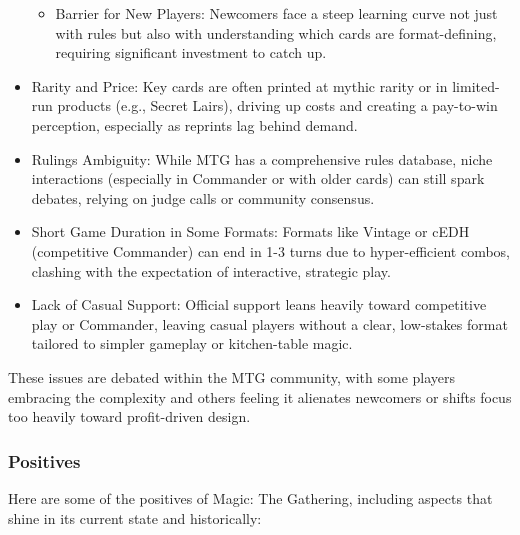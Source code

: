 \begin{itemize}
\begin{itemize}
		\item Barrier for New Players: Newcomers face a steep learning curve not just with rules but also with understanding which cards are format-defining, requiring significant investment to catch up.
	\end{itemize}
\item Rarity and Price: Key cards are often printed at mythic rarity or in limited-run products (e.g., Secret Lairs), driving up costs and creating a pay-to-win perception, especially as reprints lag behind demand.
\item Rulings Ambiguity: While MTG has a comprehensive rules database, niche interactions (especially in Commander or with older cards) can still spark debates, relying on judge calls or community consensus.
\item Short Game Duration in Some Formats: Formats like Vintage or cEDH (competitive Commander) can end in 1-3 turns due to hyper-efficient combos, clashing with the expectation of interactive, strategic play.
\item Lack of Casual Support: Official support leans heavily toward competitive play or Commander, leaving casual players without a clear, low-stakes format tailored to simpler gameplay or kitchen-table magic.
\end{itemize}

These issues are debated within the MTG community, with some players embracing the complexity and others feeling it alienates newcomers or shifts focus too heavily toward profit-driven design.


\subsubsection{Positives}

Here are some of the positives of Magic: The Gathering, including aspects that shine in its current state and historically:

